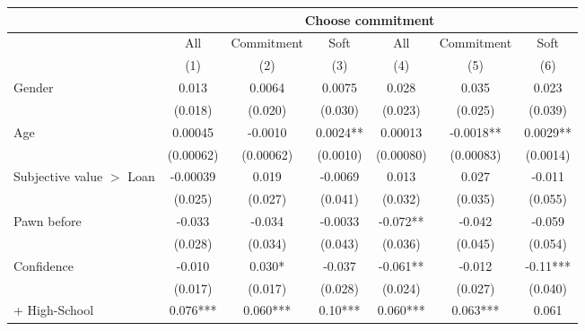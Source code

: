 \begin{tabular}{lcccccc}
\toprule
      & \multicolumn{6}{c}{Choose commitment} \\
\midrule
      & All   & Commitment  & Soft  & All   & Commitment  & Soft \\
\midrule
      & (1)   & (2)   & (3)   & (4)   & (5)   & (6) \\
\midrule
\midrule
Gender & 0.013 & 0.0064 & 0.0075 & \cellcolor[rgb]{ .839,  .863,  .894}0.028 & 0.035 & \cellcolor[rgb]{ .839,  .863,  .894}0.023 \\
      & (0.018) & (0.020) & (0.030) & \cellcolor[rgb]{ .839,  .863,  .894}(0.023) & (0.025) & \cellcolor[rgb]{ .839,  .863,  .894}(0.039) \\
Age   & 0.00045 & \cellcolor[rgb]{ .839,  .863,  .894}-0.0010 & \cellcolor[rgb]{ .839,  .863,  .894}0.0024** & 0.00013 & \cellcolor[rgb]{ .839,  .863,  .894}-0.0018** & \cellcolor[rgb]{ .839,  .863,  .894}0.0029** \\
      & (0.00062) & \cellcolor[rgb]{ .839,  .863,  .894}(0.00062) & \cellcolor[rgb]{ .839,  .863,  .894}(0.0010) & (0.00080) & \cellcolor[rgb]{ .839,  .863,  .894}(0.00083) & \cellcolor[rgb]{ .839,  .863,  .894}(0.0014) \\
Subjective value $>$ Loan & -0.00039 & \cellcolor[rgb]{ .839,  .863,  .894}0.019 & -0.0069 & 0.013 & 0.027 & -0.011 \\
      & (0.025) & \cellcolor[rgb]{ .839,  .863,  .894}(0.027) & (0.041) & (0.032) & (0.035) & (0.055) \\
Pawn before & -0.033 & \cellcolor[rgb]{ .839,  .863,  .894}-0.034 & -0.0033 & \cellcolor[rgb]{ .839,  .863,  .894}-0.072** & -0.042 & \cellcolor[rgb]{ .839,  .863,  .894}-0.059 \\
      & (0.028) & \cellcolor[rgb]{ .839,  .863,  .894}(0.034) & (0.043) & \cellcolor[rgb]{ .839,  .863,  .894}(0.036) & (0.045) & \cellcolor[rgb]{ .839,  .863,  .894}(0.054) \\
Confidence & -0.010 & \cellcolor[rgb]{ .839,  .863,  .894}0.030* & \cellcolor[rgb]{ .839,  .863,  .894}-0.037 & \cellcolor[rgb]{ .839,  .863,  .894}-0.061** & -0.012 & \cellcolor[rgb]{ .839,  .863,  .894}-0.11*** \\
      & (0.017) & \cellcolor[rgb]{ .839,  .863,  .894}(0.017) & \cellcolor[rgb]{ .839,  .863,  .894}(0.028) & \cellcolor[rgb]{ .839,  .863,  .894}(0.024) & (0.027) & \cellcolor[rgb]{ .839,  .863,  .894}(0.040) \\
+ High-School & \cellcolor[rgb]{ .839,  .863,  .894}0.076*** & \cellcolor[rgb]{ .839,  .863,  .894}0.060*** & \cellcolor[rgb]{ .839,  .863,  .894}0.10*** & \cellcolor[rgb]{ .839,  .863,  .894}0.060*** & \cellcolor[rgb]{ .839,  .863,  .894}0.063*** & \cellcolor[rgb]{ .839,  .863,  .894}0.061 \\

\end{tabular}
